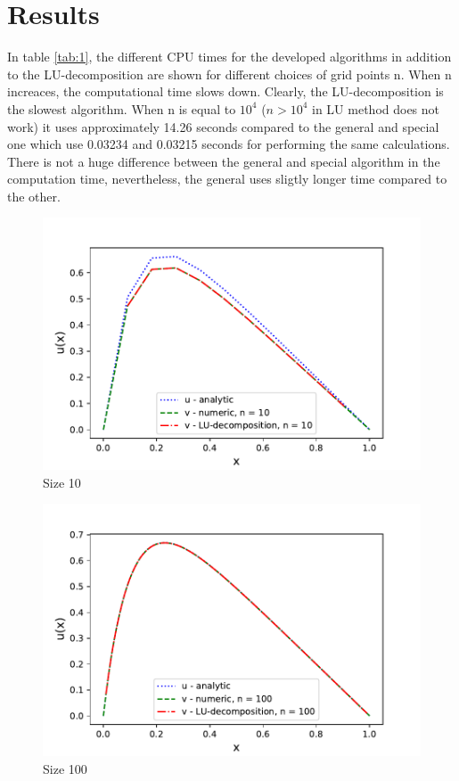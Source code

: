 \documentclass{article}
\begin{document}
\section{Results}

In  table \ref{tab:1}, the different CPU times for the developed algorithms in addition to the LU-decomposition are shown for different choices of grid points n. When n increaces, the computational time slows down. Clearly, the LU-decomposition is the slowest algorithm. When n is equal to $10^4$ ($n>10^4$ in LU method does not work) it uses approximately 14.26 seconds compared to the general and special one which use 0.03234 and 0.03215 seconds for performing the same calculations. There is not a huge difference between the general and special algorithm in the computation time, nevertheless, the general uses sligtly longer time compared to the other. 


\begin{figure}[h]
    \centering
    \includegraphics[width =12cm]{python/size_10.pdf}
    \caption{Size 10}
    \label{fig:1}
\end{figure}

\begin{figure}[h]
    \centering
    \includegraphics[width =12cm]{python/size_100.pdf}
    \caption{Size 100}
    \label{fig:2}
\end{figure}
\end{document}
